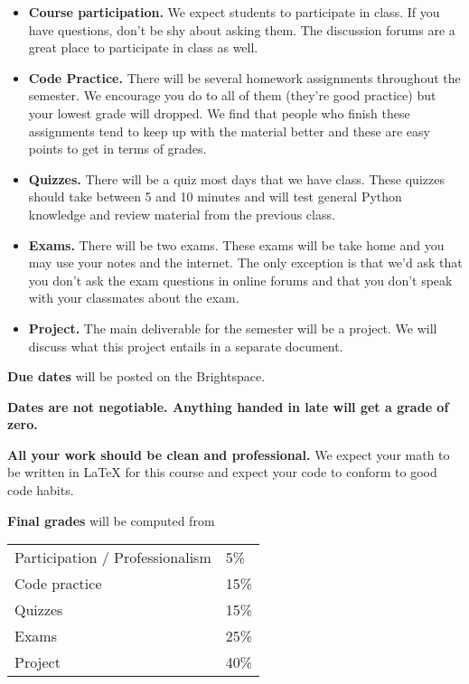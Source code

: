 \documentclass[12pt,pdftex,twoside,letterpaper]{exam}
\begin{document}
    \begin{itemize}
      \item {\bf Course participation.} We expect students to participate in class. If you have
          questions, don't be shy about asking them. The discussion forums are a great place to
          participate in class as well.
      \item {\bf Code Practice.} There will be several homework assignments throughout the
          semester. We encourage you do to all of them (they're good practice) but your lowest
          grade will dropped. We find that people who finish these assignments tend to keep up
          with the material better and these are easy points to get in terms of grades.
      \item {\bf Quizzes.} There will be a quiz most days that we have class. These quizzes should
          take between 5 and 10 minutes and will test general Python knowledge and review
          material from the previous class.
      \item {\bf Exams.} There will be two exams. These exams will be take home and you may use
          your notes and the internet. The only exception is that we'd ask that you don't ask
          the exam questions in online forums and that you don't speak with your classmates about
          the exam.
      \item {\bf Project.} The main deliverable for the semester will be a project. We will discuss
          what this project entails in a separate document.
    \end{itemize}


    {\bf Due dates} will be posted on the Brightspace.

    {\bf Dates are not negotiable. Anything handed in late will get a grade of zero.}

    {\bf All your work should be clean and professional.} We expect your math to be written in
    LaTeX for this course and expect your code to conform to good code habits.

    {\bf Final grades\/} will be computed from

    \begin{center}
      \begin{tabular}{ll}
        Participation / Professionalism & 5\% \\
        Code practice & 15\% \\
        Quizzes & 15\% \\
        Exams & 25\% \\
        Project & 40\%
      \end{tabular}
    \end{center}
\end{document}
